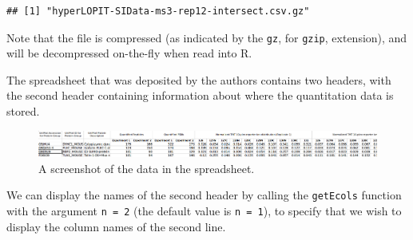\begin{knitrout}
\color{fgcolor}\begin{kframe}
\begin{alltt}
\hlstd{(}\hlstd{)}
 \hlkwb{<-} \hlstd{(}\hlstd{,}  \hlstd{=} \hlstd{)}
 \hlkwb{<-}   \hlstd{=} \hlstd{,}
           \hlstd{=} \hlstd{)}
\end{alltt}
\begin{verbatim}
## [1] "hyperLOPIT-SIData-ms3-rep12-intersect.csv.gz"
\end{verbatim}
\end{kframe}
\end{knitrout}

Note that the file is compressed (as indicated by the \texttt{gz}, for
\texttt{gzip}, extension), and will be decompressed on-the-fly when
read into R.

The spreadsheet that was deposited by the authors contains two
headers, with the second header containing information about where the
quantitation data is stored. 

\begin{figure}[!ht]
  \centering
  \includegraphics[width=.85\textwidth]{./Figures/spreadsheet-screenshot.png}
  \caption{A screenshot of the data in the spreadsheet.}
  \label{fig:spreadsheet}
\end{figure}


We can display the names of the second header by calling the
\texttt{getEcols} function with the argument \texttt{n = 2} (the default value is \texttt{n
= 1}), to specify that we wish to display the column names of the
second line.


